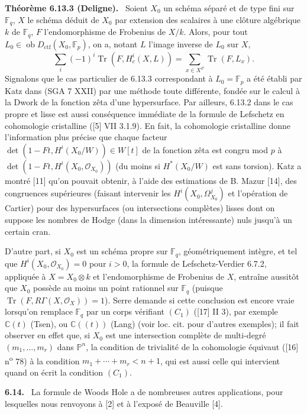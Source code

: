 \documentclass[11pt]{article}
\newenvironment{statement}[1]{\par\medskip\noindent\textbf{#1.}\ }{\par\medskip}
\newcommand{\ob}{\operatorname{ob}}
\providecommand{\ctf}{\mathrm{ctf}}
\providecommand{\Tr}{\operatorname{Tr}}
\providecommand{\OO}{\mathcal O}
\begin{document}
\begin{statement}{Théorème 6.13.3 (Deligne)}
Soient $X_0$ un schéma séparé et de type fini sur $\mathbb F_q$, $X$ le schéma déduit de $X_0$ par extension des scalaires à une clôture algébrique $k$ de $\mathbb F_q$, $F$ l'endomorphisme de Frobenius de $X/k$. Alors, pour tout $L_0\in\ob D_{\ctf}(X_0,\mathbb F_p)$, on a, notant $L$ l'image inverse de $L_0$ sur $X$,
\[
\sum_i(-1)^i\Tr(F,H^i_c(X,L))=\sum_{x\in X^F}\Tr(F,L_x).
\]
Signalons que le cas particulier de 6.13.3 correspondant à $L_0=\mathbb F_p$ a été établi par Katz dans (SGA 7 XXII) par une méthode toute différente, fondée sur le calcul à la Dwork de la fonction zêta d'une hypersurface. Par ailleurs, 6.13.2 dans le cas propre et lisse est aussi conséquence immédiate de la formule de Lefschetz en cohomologie cristalline ([5] VII 3.1.9). En fait, la cohomologie cristalline donne l'information plus précise que chaque facteur $\det(1-Ft,H^i(X_0/W))\in W[t]$ de la fonction zêta est congru mod $p$ à $\det(1-Ft,H^i(X_0,\OO_{X_0}))$ (du moins si $H^*(X_0/W)$ est sans torsion). Katz a montré [11] qu'on pouvait obtenir, à l'aide des estimations de B. Mazur [14], des congruences supérieures (faisant intervenir les $H^i(X_0,\Omega^j_{X_0})$ et l'opération de Cartier) pour des hypersurfaces (ou intersections complètes) lisses dont on suppose les nombres de Hodge (dans la dimension intéressante) nuls jusqu'à un certain cran.

D'autre part, si $X_0$ est un schéma propre sur $\mathbb F_q$, géométriquement intègre, et tel que $H^i(X_0,\OO_{X_0})=0$ pour $i>0$, la formule de Lefschetz-Verdier 6.7.2, appliquée à $X=X_0\otimes k$ et l'endomorphisme de Frobenius de $X$, entraîne aussitôt que $X_0$ possède au moins un point rationnel sur $\mathbb F_q$ (puisque $\Tr(F,R\Gamma(X,\OO_X))=1$). Serre demande si cette conclusion est encore vraie lorsqu'on remplace $\mathbb F_q$ par un corps vérifiant $(C_1)$ ([17] II 3), par exemple $\mathbb C(t)$ (Tsen), ou $\mathbb C((t))$ (Lang) (voir loc. cit. pour d'autres exemples); il fait observer en effet que, si $X_0$ est une intersection complète de multi-degré $(m_1,\ldots,m_r)$ dans $\mathbb P^n$, la condition de trivialité de la cohomologie équivaut ([16] n\textsuperscript{o} 78) à la condition $m_1+\cdots+m_r<n+1$, qui est aussi celle qui intervient quand on écrit la condition $(C_1)$.
\end{statement}

\begin{statement}{6.14}
La formule de Woods Hole a de nombreuses autres applications, pour lesquelles nous renvoyons à [2] et à l'exposé de Beauville [4].
\end{statement}
\end{document}
